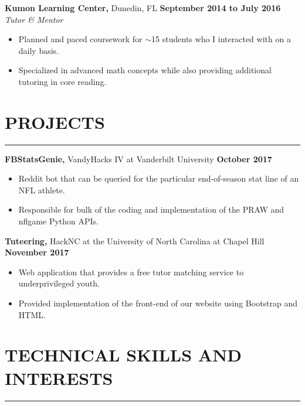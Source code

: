 \documentclass[11pt]{article} %
\begin{document}
		\vspace{.1cm}
	
		\noindent \textbf{Kumon Learning Center,} Dunedin, FL \hfill\textbf{September 2014 to July 2016}\\
		\textit{Tutor \& Mentor}
		\begin{itemize}[noitemsep,nolistsep, label={-}]
			\item Planned and paced coursework for $\sim$15 students who I interacted with on a daily basis.
			\item Specialized in advanced math concepts while also providing additional tutoring in core reading.
		\end{itemize}
		
		\vspace{.1cm}
	
	\section*{PROJECTS}
		\hrule \relax
		\vspace{.4cm}
		
		\noindent \textbf{FBStatsGenie,} VandyHacks IV at Vanderbilt University \hfill\textbf{October 2017}
		\begin{itemize}[noitemsep,nolistsep, label={-}]
			\item Reddit bot that can be queried for the particular end-of-season stat line of an NFL athlete.
			\item Responsible for bulk of the coding and implementation of the PRAW and nflgame Python APIs.
		\end{itemize}
		
		\vspace{.1cm}
	
		\noindent \textbf{Tuteering,} HackNC at the University of North Carolina at Chapel Hill \hfill\textbf{November 2017}
		\begin{itemize}[noitemsep,nolistsep, label={-}]
			\item Web application that provides a free tutor matching service to underprivileged youth.
			\item Provided implementation of the front-end of our website using Bootstrap and HTML.
		\end{itemize}
	
		\vspace{.1cm}
	
	\section*{TECHNICAL SKILLS AND INTERESTS}
		\hrule \relax
		\vspace{.4cm}
		
\end{document}
